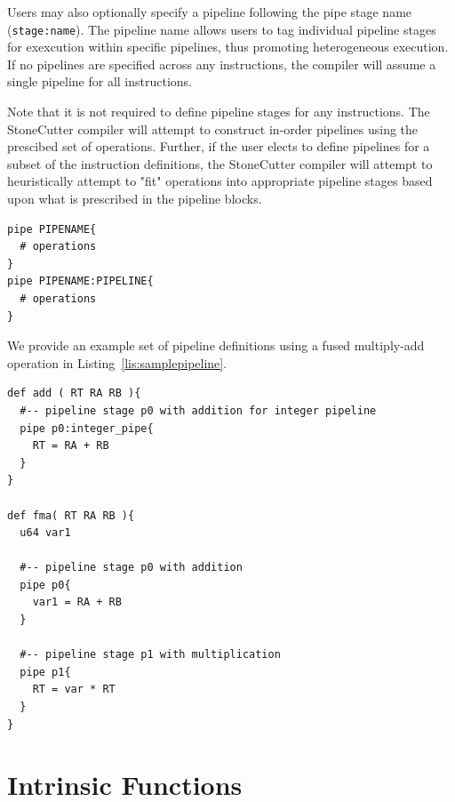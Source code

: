 \documentclass{article}
\begin{document}
Users may also optionally specify a pipeline following the pipe stage name (\texttt{stage:name}).  
The pipeline name allows users to tag individual pipeline stages for exexcution within specific 
pipelines, thus promoting heterogeneous execution.  If no pipelines are specified across any 
instructions, the compiler will assume a single pipeline for all instructions.

Note that it is not required to define pipeline stages for any instructions.  The StoneCutter 
compiler will attempt to construct in-order pipelines using the prescibed set of operations.  Further, 
if the user elects to define pipelines for a subset of the instruction definitions, the 
StoneCutter compiler will attempt to heuristically attempt to "fit" operations 
into appropriate pipeline stages based upon what is prescribed in the pipeline blocks.

\vspace{0.125in}
\begin{lstlisting}[frame=single,style=base,caption={Pipeline Syntax},captionpos=b,label={lis:pipelinesyntax}]
pipe PIPENAME{
  # operations
}
pipe PIPENAME:PIPELINE{
  # operations
}
\end{lstlisting}

We provide an example set of pipeline definitions using a fused multiply-add operation in Listing~\ref{lis:samplepipeline}.

\vspace{0.125in}
\begin{lstlisting}[frame=single,style=base,caption={Sample Pipeline},captionpos=b,label={lis:samplepipeline}]
def add ( RT RA RB ){
  #-- pipeline stage p0 with addition for integer pipeline
  pipe p0:integer_pipe{
    RT = RA + RB
  }
}

def fma( RT RA RB ){
  u64 var1

  #-- pipeline stage p0 with addition
  pipe p0{
    var1 = RA + RB
  }

  #-- pipeline stage p1 with multiplication
  pipe p1{
    RT = var * RT
  }
}
\end{lstlisting}


\clearpage
\section{Intrinsic Functions}
\label{sec:IntrinsicFunctions}
\end{document}
